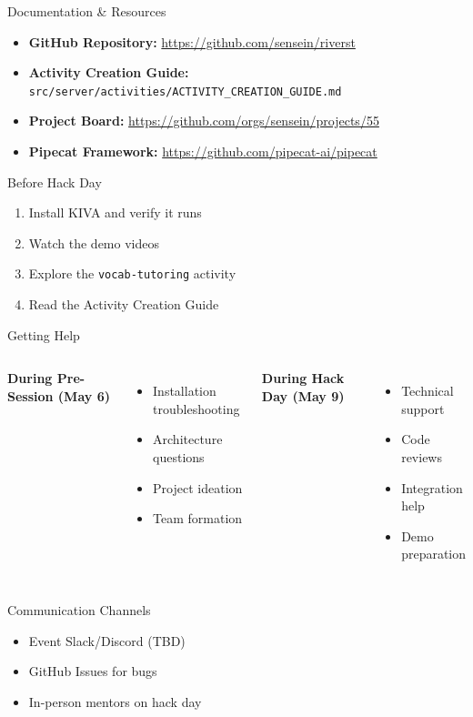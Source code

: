 \documentclass[aspectratio=169]{beamer}
\begin{document}
\begin{frame}{Documentation \& Resources}
\begin{itemize}
    \item \textbf{GitHub Repository:} \url{https://github.com/sensein/riverst}
    \item \textbf{Activity Creation Guide:} \texttt{src/server/activities/ACTIVITY\_CREATION\_GUIDE.md}
    \item \textbf{Project Board:} \url{https://github.com/orgs/sensein/projects/55}
    \item \textbf{Pipecat Framework:} \url{https://github.com/pipecat-ai/pipecat}
\end{itemize}

\vspace{0.3cm}

\begin{block}{Before Hack Day}
\begin{enumerate}
    \item Install KIVA and verify it runs
    \item Watch the demo videos
    \item Explore the \texttt{vocab-tutoring} activity
    \item Read the Activity Creation Guide
\end{enumerate}
\end{block}
\end{frame}

\begin{frame}{Getting Help}
\begin{columns}[T]
\textbf{During Pre-Session (May 6)}
\begin{itemize}
    \item Installation troubleshooting
    \item Architecture questions
    \item Project ideation
    \item Team formation
\end{itemize}

\textbf{During Hack Day (May 9)}
\begin{itemize}
    \item Technical support
    \item Code reviews
    \item Integration help
    \item Demo preparation
\end{itemize}
\end{columns}

\vspace{0.5cm}

\begin{block}{Communication Channels}
\begin{itemize}
    \item Event Slack/Discord (TBD)
    \item GitHub Issues for bugs
    \item In-person mentors on hack day
\end{itemize}
\end{block}
\end{frame}
\end{document}
